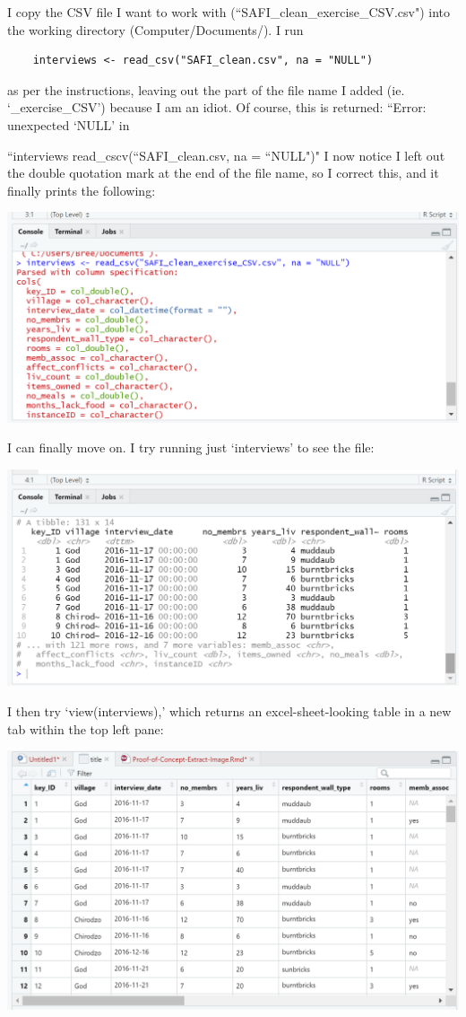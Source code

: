 \documentclass{article}
\begin{document}
I copy the CSV file I want to work with (``SAFI\_clean\_exercise\_CSV.csv") into the working directory (Computer/Documents/). I run 

\begin{verbatim}
    interviews <- read_csv("SAFI_clean.csv", na = "NULL") 
\end{verbatim}

 as per the instructions, leaving out the part of the file name I added (ie. `\_exercise\_CSV') because I am an idiot. Of course, this is returned: ``Error: unexpected `NULL' in 
 
 ``interviews \<\- read\_cscv(``SAFI\_clean.csv, na = ``NULL")" I now notice I left out the double quotation mark at the end of the file name, so I correct this, and it finally prints the following:

\includegraphics[width=1.0\textwidth]{rstudio_15.PNG}

I can finally move on. I try running just `interviews' to see the file:

\includegraphics[width=1.0\textwidth]{rstudio_16.PNG}

I then try `view(interviews),' which returns an excel-sheet-looking table in a new tab within the top left pane:

\includegraphics[width=1.0\textwidth]{rstudio_17.PNG}
\end{document}
